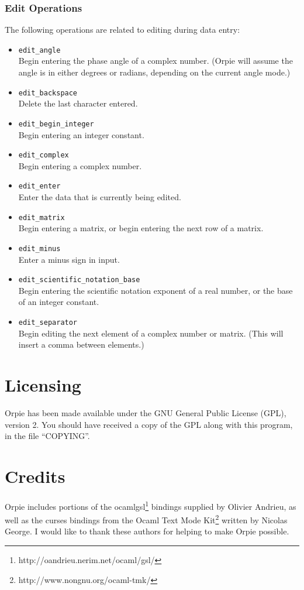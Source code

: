 \documentclass[11pt,notitlepage]{article}
\begin{document}
\subsubsection{Edit Operations}
\label{edits}
The following operations are related to editing during data entry:
\begin{itemize}
   \item {\tt edit\_angle} \\
      Begin entering the phase angle of a complex number.  (Orpie will
      assume the angle is in either degrees or radians, depending on
      the current angle mode.)
   \item {\tt edit\_backspace} \\
      Delete the last character entered.
   \item {\tt edit\_begin\_integer} \\
      Begin entering an integer constant.
   \item {\tt edit\_complex} \\
      Begin entering a complex number.
   \item {\tt edit\_enter} \\
      Enter the data that is currently being edited.
   \item {\tt edit\_matrix} \\
      Begin entering a matrix, or begin entering the next
      row of a matrix.
   \item {\tt edit\_minus} \\
      Enter a minus sign in input.
   \item {\tt edit\_scientific\_notation\_base} \\
      Begin entering the scientific notation exponent of a real number,
      or the base of an integer constant.
   \item {\tt edit\_separator} \\
      Begin editing the next element of a complex number or
      matrix.  (This will insert a comma between elements.)
\end{itemize}


\section{Licensing}
Orpie has been made available under the GNU General Public License (GPL), 
version 2.  You should have received a copy of the GPL along with this 
program, in the file ``COPYING''.


\section{Credits}
Orpie includes portions of the
ocamlgsl\footnote{http://oandrieu.nerim.net/ocaml/gsl/} bindings supplied by
Olivier Andrieu, as well as the curses bindings from the Ocaml Text Mode
Kit\footnote{http://www.nongnu.org/ocaml-tmk/} written by Nicolas George.  I
would like to thank these authors for helping to make Orpie possible.
\end{document}
